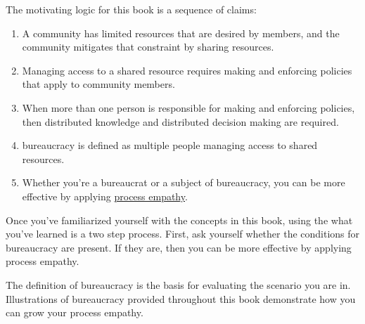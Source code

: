 The motivating logic for this book is a sequence of claims:
\begin{enumerate}
    \item A community has limited resources that are desired by members, and the community mitigates that constraint by sharing resources.
    \item Managing access to a \gls{shared resource} requires making and enforcing policies that apply to community members. 
    \item When more than one person is responsible for making and enforcing policies, then distributed knowledge and distributed decision making are required. 
    \item \Gls{bureaucracy} is defined as multiple people managing access to \glspl{shared resource}. 
    \item Whether you're a \gls{bureaucrat} or a subject of bureaucracy, you can be more effective by applying \hyperref[sec:process-empathy]{process empathy}.
\end{enumerate}

Once you've familiarized yourself with the concepts in this book, using the what you've learned is a two step process. First, ask yourself whether the conditions for bureaucracy are present. If they are, then you can be more effective by applying process empathy.

The definition of bureaucracy is the basis for evaluating the scenario you are in. Illustrations of bureaucracy provided throughout this book demonstrate how you can grow your process empathy. 